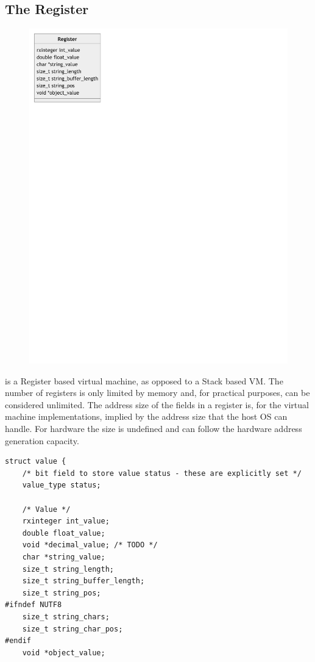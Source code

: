 \subsection{The Register}
\begin{figure}
\includegraphics[scale=0.6]{charts/register.pdf}
\end{figure}


\crexx{}  is a Register based virtual machine, as opposed to a Stack based
VM. The number of registers is only limited by memory and, for
practical purposes, can be considered unlimited. The address size of
the fields in a register is, for the virtual machine implementations,
implied by the address size that the host OS can handle. For hardware
the size is undefined and can follow the hardware address generation
capacity.


\begin{lstlisting}[label=crexxregister,caption={The
\crexx{} Register implementation in C}]
struct value {
    /* bit field to store value status - these are explicitly set */
    value_type status;

    /* Value */
    rxinteger int_value;
    double float_value;
    void *decimal_value; /* TODO */
    char *string_value;
    size_t string_length;
    size_t string_buffer_length;
    size_t string_pos;
#ifndef NUTF8
    size_t string_chars;
    size_t string_char_pos;
#endif
    void *object_value;
\end{lstlisting}

